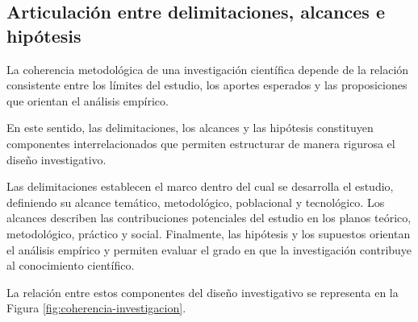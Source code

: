 \begin{refsection}
\section{Articulación entre delimitaciones, alcances e hipótesis}

La coherencia metodológica de una investigación científica depende de la relación consistente entre los límites del estudio, los aportes esperados y las proposiciones que orientan el análisis empírico.

En este sentido, las delimitaciones, los alcances y las hipótesis constituyen componentes interrelacionados que permiten estructurar de manera rigurosa el diseño investigativo.

Las delimitaciones establecen el marco dentro del cual se desarrolla el estudio, definiendo su alcance temático, metodológico, poblacional y tecnológico. Los alcances describen las contribuciones potenciales del estudio en los planos teórico, metodológico, práctico y social. Finalmente, las hipótesis y los supuestos orientan el análisis empírico y permiten evaluar el grado en que la investigación contribuye al conocimiento científico.

La relación entre estos componentes del diseño investigativo se representa en la Figura \ref{fig:coherencia-investigacion}.

\begin{figure}[htbp]
\centering
{}
\end{figure}
\end{refsection}
